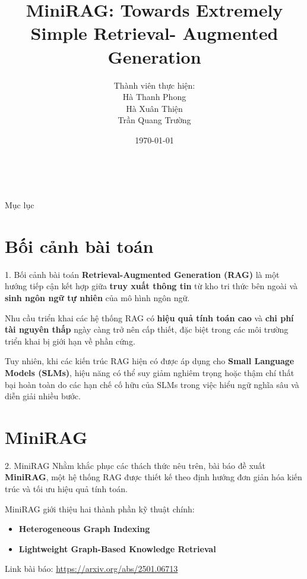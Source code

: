 \documentclass[11pt]{beamer}
\author[University of Information Technology]{
    Thành viên thực hiện: \\ 
    Hà Thanh Phong \- 24520024 \\ 
    Hà Xuân Thiện \- 24520031 \\ 
    Trần Quang Trường \- 24521901
}
\title[MiniRAG]{MiniRAG\@: Towards Extremely Simple Retrieval- Augmented Generation}
\institute[]{University of Information Technology \- VNUHCM}
\date{\today}
\begin{document}
\begin{frame}
    \titlepage\
\end{frame}

\begin{frame}{Mục lục}
    \tableofcontents\
\end{frame}

\section{Bối cảnh bài toán}

\begin{frame}{1. Bối cảnh bài toán}
\textbf{Retrieval-Augmented Generation (RAG)} là một hướng tiếp cận kết hợp giữa
\textbf{truy xuất thông tin} từ kho tri thức bên ngoài và \textbf{sinh ngôn ngữ tự nhiên}
của mô hình ngôn ngữ.

\vspace{0.2cm}
\pause

Nhu cầu triển khai các hệ thống RAG có \textbf{hiệu quả tính toán cao} và
\textbf{chi phí tài nguyên thấp} ngày càng trở nên cấp thiết, đặc biệt trong
các môi trường triển khai bị giới hạn về phần cứng.

\vspace{0.2cm}

Tuy nhiên, khi các kiến trúc RAG hiện có được áp dụng cho
\textbf{Small Language Models (SLMs)}, hiệu năng có thể suy giảm nghiêm trọng
hoặc thậm chí thất bại hoàn toàn do các hạn chế cố hữu của SLMs trong việc
hiểu ngữ nghĩa sâu và diễn giải nhiều bước.
  
\end{frame}

\section{MiniRAG}

\begin{frame}{2. MiniRAG}
    Nhằm khắc phục các thách thức nêu trên, bài báo đề xuất \textbf{MiniRAG},
    một hệ thống RAG được thiết kế theo định hướng đơn giản hóa kiến trúc và
    tối ưu hiệu quả tính toán.

    \vspace{0.2cm}

    MiniRAG giới thiệu hai thành phần kỹ thuật chính:
    \begin{itemize}
        \item \textbf{Heterogeneous Graph Indexing}
        \item \textbf{Lightweight Graph-Based Knowledge Retrieval}
    \end{itemize}
    \vspace{0.5cm}
    Link bài báo: \url{https://arxiv.org/abs/2501.06713}
\end{frame}
\end{document}

